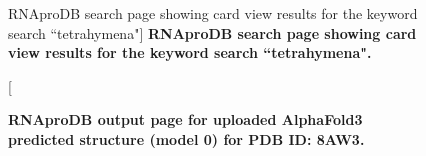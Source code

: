 \begin{center}
    \begin{figure}[H]
        \caption[RNAproDB search page showing card view results for the keyword search ``tetrahymena"]{\textbf{ RNAproDB search page showing card view results for the keyword search ``tetrahymena".}}
  \label{fig:rnaprodbS1}
\end{figure}
\end{center}

\begin{center}
    \begin{figure}[H]
        \caption[RNAproDB output page for uploaded AlphaFold3 predicted structure (model 0) for PDB ID: 8AW3]{\textbf{ RNAproDB output page for uploaded AlphaFold3 predicted structure (model 0) for PDB ID: 8AW3.}}
  \label{fig:rnaprodbS2}
\end{figure}
\end{center}
